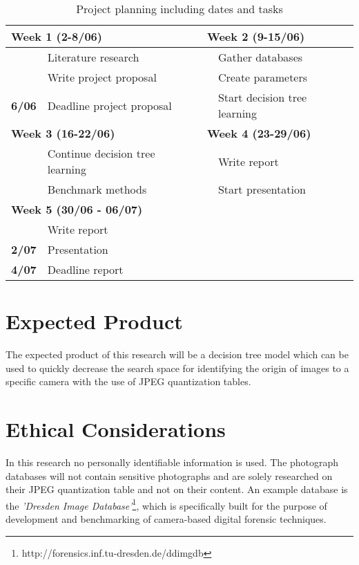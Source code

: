 \documentclass[a4paper,8pt]{article}
\begin{document}
\begin{table}[H]
\small
\caption{Project planning including dates and tasks}
\label{table:planning}
\begin{tabular}{|l l|l l|}

\hline
\multicolumn{2}{|l|}{\textbf{Week 1 (2-8/06)}} & \multicolumn{2}{|l|}{\textbf{Week 2 (9-15/06)}}\\
\hline
& Literature research & & Gather databases \\
& Write project proposal & & Create parameters  \\

\textbf{6/06} & Deadline project proposal & & Start decision tree learning \\ 
\hline
\multicolumn{2}{|l|}{\textbf{Week 3 (16-22/06)}} & \multicolumn{2}{|l|}{\textbf{Week 4 (23-29/06)}}\\
\hline
& Continue decision tree learning & & Write report\\
& Benchmark methods & & Start presentation\\
\hline
\multicolumn{2}{|l|}{\textbf{Week 5 (30/06 - 06/07)}} & & \\
\hline
& Write report &  \multicolumn{2}{|c|}{~} \\
\textbf{2/07} & Presentation &   \multicolumn{2}{|c|}{~}\\
\textbf{4/07} & Deadline report &  \multicolumn{2}{|c|}{~} \\
\hline

\hline
\end{tabular}

\end{table}

\vspace{-2em}
\section*{Expected Product}
The expected product of this research will be a decision tree model which can be used to quickly decrease the search space for identifying the origin of images to a specific camera with the use of JPEG quantization tables.

\section*{Ethical Considerations}
In this research no personally identifiable information is used. The photograph databases will not contain sensitive photographs and  are solely researched on their JPEG quantization table and not on their content. An example database is the \textit{'Dresden Image Database'}\footnote{http://forensics.inf.tu-dresden.de/ddimgdb}, which is specifically built for the purpose of development and benchmarking of camera-based digital forensic techniques.

\pagebreak

{}

\end{document}
